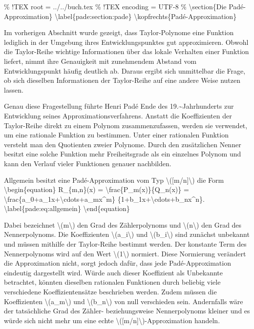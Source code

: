 \% !TEX root = ../../buch.tex \% !TEX encoding = UTF-8 \%
\textbackslash section\{Die Padé-Approximation\}
\textbackslash label\{pade:section:pade\}
\textbackslash kopfrechts\{Padé-Approximation\}

Im vorherigen Abschnitt wurde gezeigt, dass Taylor-Polynome eine
Funktion lediglich in der Umgebung ihres Entwicklungspunktes gut
approximieren. Obwohl die Taylor-Reihe wichtige Informationen über das
lokale Verhalten einer Funktion liefert, nimmt ihre Genauigkeit mit
zunehmendem Abstand vom Entwicklungspunkt häufig deutlich ab. Daraus
ergibt sich unmittelbar die Frage, ob sich dieselben Informationen der
Taylor-Reihe auf eine andere Weise nutzen lassen.

Genau diese Fragestellung führte Henri Padé Ende des
19.\textasciitilde Jahrhunderts zur Entwicklung seines
Approximationsverfahrens. Anstatt die Koeffizienten der Taylor-Reihe
direkt zu einem Polynom zusammenzufassen, werden sie verwendet, um eine
rationale Funktion zu bestimmen. Unter einer rationalen Funktion
versteht man den Quotienten zweier Polynome. Durch den zusätzlichen
Nenner besitzt eine solche Funktion mehr Freiheitsgrade als ein
einzelnes Polynom und kann den Verlauf vieler Funktionen genauer
nachbilden.

Allgemein besitzt eine Padé-Approximation vom Typ
\textbackslash({[}m/n{]}\textbackslash) die Form
\textbackslash begin\{equation\} R\_\{m,n\}(x) =
\textbackslash frac\{P\_m(x)\}\{Q\_n(x)\} =
\textbackslash frac\{a\_0+a\_1x+\textbackslash cdots+a\_mx\^{}m\}
\{1+b\_1x+\textbackslash cdots+b\_nx\^{}n\}.
\textbackslash label\{pade:eq:allgemein\} \textbackslash end\{equation\}

Dabei bezeichnet \textbackslash(m\textbackslash) den Grad des
Zählerpolynoms und \textbackslash(n\textbackslash) den Grad des
Nennerpolynoms. Die Koeffizienten \textbackslash(a\_i\textbackslash) und
\textbackslash(b\_i\textbackslash) sind zunächst unbekannt und müssen
mithilfe der Taylor-Reihe bestimmt werden. Der konstante Term des
Nennerpolynoms wird auf den Wert \textbackslash(1\textbackslash)
normiert. Diese Normierung verändert die Approximation nicht, sorgt
jedoch dafür, dass jede Padé-Approximation eindeutig dargestellt wird.
Würde auch dieser Koeffizient als Unbekannte betrachtet, könnten
dieselben rationalen Funktionen durch beliebig viele verschiedene
Koeffizientensätze beschrieben werden. Zudem müssen die Koeffizienten
\textbackslash(a\_m\textbackslash) und
\textbackslash(b\_n\textbackslash) von null verschieden sein.
Andernfalls wäre der tatsächliche Grad des Zähler- beziehungsweise
Nennerpolynoms kleiner und es würde sich nicht mehr um eine echte
\textbackslash({[}m/n{]}\textbackslash)-Approximation handeln.

